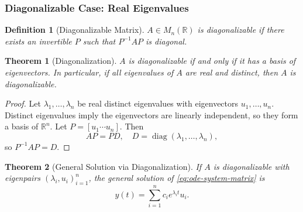 \documentclass{article}
\newtheorem{theorem}{Theorem}
\newtheorem{definition}{Definition}
\newcommand{\R}{\mathbb{R}}
\begin{document}
\subsubsection{Diagonalizable Case: Real Eigenvalues}

\begin{definition}[Diagonalizable Matrix]
    $A \in M_n(\R)$ is \emph{diagonalizable} if there exists 
    an invertible $P$ such that $P^{-1}AP$ is diagonal.
\end{definition}

\begin{theorem}[Diagonalization]
    $A$ is diagonalizable if and only if it has a basis of 
    eigenvectors. In particular, if all eigenvalues of $A$ are real 
    and distinct, then $A$ is diagonalizable.
\end{theorem}

\begin{proof}
    Let $\lambda_1,\ldots,\lambda_n$ be real distinct eigenvalues 
    with eigenvectors $u_1,\ldots,u_n$. Distinct eigenvalues imply 
    the eigenvectors are linearly independent, so they form a basis 
    of $\R^n$. Let $P = [u_1 \cdots u_n]$. Then
    \[AP = PD, \quad D = \operatorname{diag}(\lambda_1,\ldots,
    \lambda_n),\]
    so $P^{-1}AP = D$.
\end{proof}

\begin{theorem}[General Solution via Diagonalization]
    If $A$ is diagonalizable with eigenpairs 
    $(\lambda_i, u_i)_{i=1}^n$, the general solution of 
    \eqref{eq:ode-system-matrix} is
    \[y(t) = \sum_{i=1}^n c_i e^{\lambda_i t} u_i.\]
\end{theorem}
\end{document}
